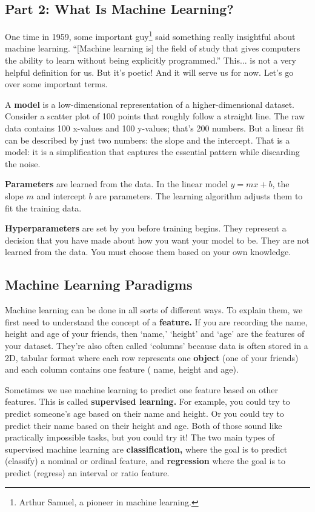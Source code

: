\subsection*{Part 2: What Is Machine Learning?}
One time in 1959, some important guy\footnote{Arthur Samuel, a pioneer in machine learning.} said something really insightful about machine learning. ``[Machine learning is] the field of study that gives computers the ability to learn without being explicitly programmed.'' This... is not a very helpful definition for us. But it's poetic! And it will serve us for now. Let's go over some important terms.

A \textbf{model} is a low-dimensional representation of a higher-dimensional dataset. Consider a scatter plot of 100 points that roughly follow a straight line. The raw data contains 100 x-values and 100 y-values; that's 200 numbers. But a linear fit can be described by just two numbers: the slope and the intercept. That is a model: it is a simplification that captures the essential pattern while discarding the noise.

\textbf{Parameters} are learned from the data. In the linear model $y = mx + b$, the slope $m$ and intercept $b$ are parameters. The learning algorithm adjusts them to fit the training data.

\textbf{Hyperparameters} are set by you before training begins. They represent a decision that you have made about how you want your model to be. They are not learned from the data. You must choose them based on your own knowledge.

\subsection*{Machine Learning Paradigms}
Machine learning can be done in all sorts of different ways. To explain them, we first need to understand the concept of a \textbf{feature.} If you are recording the name, height and age of your friends, then `name,' `height' and `age' are the features of your dataset. They're also often called `columns' because data is often stored in a 2D, tabular format where each row represents one \textbf{object} (one of your friends) and each column contains one feature (\eg{} name, height and age).

Sometimes we use machine learning to predict one feature based on other features. This is called \textbf{supervised learning.} For example, you could try to predict someone's age based on their name and height. Or you could try to predict their name based on their height and age. Both of those sound like practically impossible tasks, but you could try it! The two main types of supervised machine learning are \textbf{classification,} where the goal is to predict (classify) a nominal or ordinal feature, and \textbf{regression} where the goal is to predict (regress) an interval or ratio feature.

